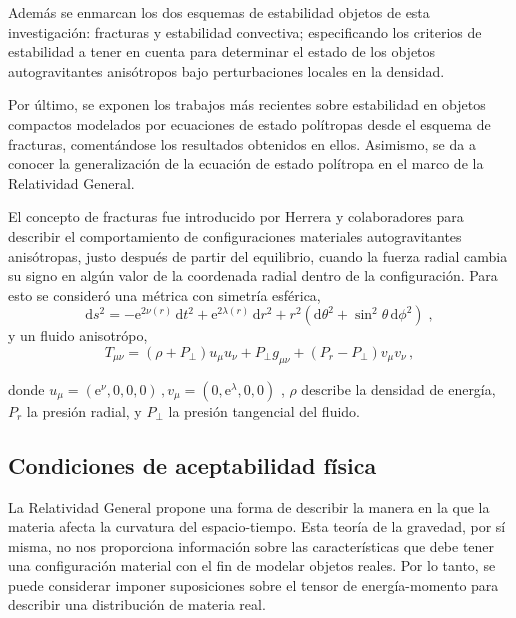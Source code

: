 \documentclass[letterpaper,11pt]{article}
\begin{document}
Además se enmarcan los dos esquemas de estabilidad objetos de esta investigación: fracturas y estabilidad convectiva; especificando los criterios de estabilidad a tener en cuenta para determinar el estado de los objetos autogravitantes anisótropos bajo perturbaciones locales en la densidad.

Por último, se exponen los trabajos más recientes sobre estabilidad en objetos compactos modelados por ecuaciones de estado polítropas desde el esquema de fracturas, comentándose los resultados obtenidos en ellos. Asimismo, se da a conocer la generalización de la ecuación de estado polítropa en el marco de la Relatividad General.

El concepto de fracturas fue introducido por Herrera y colaboradores \cite{Herrera1992,DiPrisco1994,DiPrisco1997,HerreraFuenmayorLeon2016} para describir el comportamiento de configuraciones materiales autogravitantes anisótropas, justo después de partir del equilibrio, cuando la fuerza radial cambia su signo en algún valor de la coordenada radial dentro de la configuración. Para esto se consideró una métrica con simetría esférica,
\begin{equation}
\mathrm{d}s^2 = {-} \mathrm{e}^{2\nu(r)}\,\mathrm{d}t^2 {+} \mathrm{e}^{ 2\lambda(r)} \,\mathrm{d}r^2 {+} r^2 \left(\mathrm{d}\theta ^2 {+}
\sin^2\theta\,\mathrm{d}\phi^2\right) \; ,
\label{metricSpherical}
\end{equation}
y un fluido anisotrópo, 
\begin{equation}
{T}_{\mu \nu}= (\rho + P_{\perp}){{u}}_\mu{ {u}}_\nu {+} P_{\perp}{g}_{\mu \nu}  +
(P_{r}-P_{\perp}){{v}}_\mu {{v}}_\nu   \,,\label{tmunu}
\end{equation}

donde $ {{u}}_\mu =  ({ \mathrm{e}^{\nu} }, 0, 0, 0)  \,, {{v}}_\mu =  (0,{ \mathrm{e}^{\lambda} }, 0, 0) $ , $ \rho $ describe la densidad de energía, $P_{r}$ la presión radial, y $ P_{\perp} $ la presión tangencial del fluido.



\subsection{Condiciones de aceptabilidad física}

La Relatividad General propone una forma de describir la manera en la que la materia afecta la curvatura del espacio-tiempo. Esta teoría de la gravedad, por sí misma, no nos proporciona información sobre las características que debe tener una configuración material con el fin de modelar objetos reales. Por lo tanto, se puede considerar imponer suposiciones sobre el tensor de energía-momento para describir una distribución de materia real.
\end{document}
